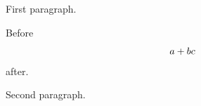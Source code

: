 \documentclass{article}
\begin{document}
First paragraph.

Before \[ a+b  c \] after.

Second paragraph.
\end{document}
